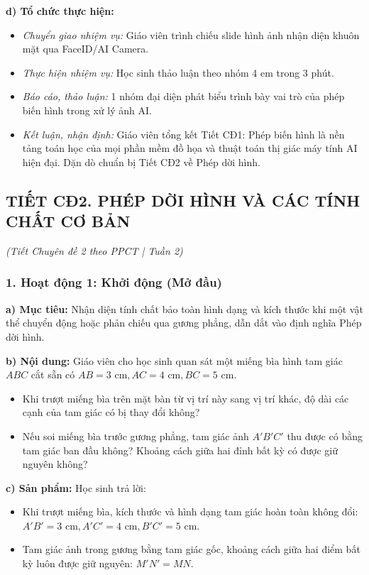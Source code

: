 \documentclass[12pt, a4paper]{article}
\begin{document}
\textbf{d) Tổ chức thực hiện:}
\begin{itemize}[leftmargin=0.6cm]
    \item \textit{Chuyển giao nhiệm vụ:} Giáo viên trình chiếu slide hình ảnh nhận diện khuôn mặt qua FaceID/AI Camera.
    \item \textit{Thực hiện nhiệm vụ:} Học sinh thảo luận theo nhóm 4 em trong 3 phút.
    \item \textit{Báo cáo, thảo luận:} 1 nhóm đại diện phát biểu trình bày vai trò của phép biến hình trong xử lý ảnh AI.
    \item \textit{Kết luận, nhận định:} Giáo viên tổng kết Tiết CĐ1: Phép biến hình là nền tảng toán học của mọi phần mềm đồ họa và thuật toán thị giác máy tính AI hiện đại. Dặn dò chuẩn bị Tiết CĐ2 về Phép dời hình.
\end{itemize}

\vspace{10pt}
\subsection*{TIẾT CĐ2. PHÉP DỜI HÌNH VÀ CÁC TÍNH CHẤT CƠ BẢN}
\textit{(Tiết Chuyên đề 2 theo PPCT | Tuần 2)}

\subsubsection*{1. Hoạt động 1: Khởi động (Mở đầu)}
\textbf{a) Mục tiêu:} Nhận diện tính chất bảo toàn hình dạng và kích thước khi một vật thể chuyển động hoặc phản chiếu qua gương phẳng, dẫn dắt vào định nghĩa Phép dời hình.

\textbf{b) Nội dung:}
Giáo viên cho học sinh quan sát một miếng bìa hình tam giác $ABC$ cắt sẵn có $AB = 3\text{ cm}, AC = 4\text{ cm}, BC = 5\text{ cm}$.
\begin{itemize}[leftmargin=0.6cm]
    \item Khi trượt miếng bìa trên mặt bàn từ vị trí này sang vị trí khác, độ dài các cạnh của tam giác có bị thay đổi không?
    \item Nếu soi miếng bìa trước gương phẳng, tam giác ảnh $A'B'C'$ thu được có bằng tam giác ban đầu không? Khoảng cách giữa hai đỉnh bất kỳ có được giữ nguyên không?
\end{itemize}

\textbf{c) Sản phẩm:} Học sinh trả lời:
\begin{itemize}[leftmargin=0.6cm]
    \item Khi trượt miếng bìa, kích thước và hình dạng tam giác hoàn toàn không đổi: $A'B' = 3\text{ cm}, A'C' = 4\text{ cm}, B'C' = 5\text{ cm}$.
    \item Tam giác ảnh trong gương bằng tam giác gốc, khoảng cách giữa hai điểm bất kỳ luôn được giữ nguyên: $M'N' = MN$.
\end{itemize}
\end{document}
